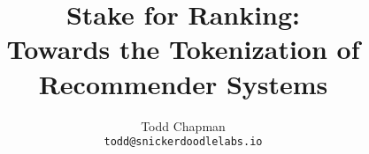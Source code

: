 \documentclass{article}
\title{Stake for Ranking: \\
Towards the Tokenization of Recommender Systems}
\author{
  Todd Chapman\\
  \texttt{todd@snickerdoodlelabs.io}
}
\begin{document}
\maketitle
\pagebreak

\tableofcontents{}
\pagebreak












\end{document}
